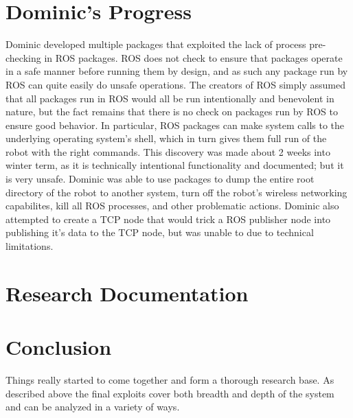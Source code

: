 \documentclass[IEEEtran,letterpaper,10pt,notitlepage,draftclsnofoot,onecolumn]{article}
\begin{document}
\section{Dominic's Progress}
Dominic developed multiple packages that exploited the lack of process pre-checking
in ROS packages. ROS does not check to ensure that packages operate in a safe manner before running
them by design, and as such any package run by ROS can quite easily do unsafe operations. The creators of 
ROS simply assumed that all packages run in ROS would all be run intentionally and benevolent in nature,
but the fact remains that there is no check on packages run by ROS to ensure good behavior. In particular,
ROS packages can make system calls to the underlying operating system's shell, which in turn gives them full 
run of the robot with the right commands. This discovery was made about 2 weeks into winter term, as it is
technically intentional functionality and documented; but it is very unsafe. Dominic was able to use packages
to dump the entire root directory of the robot to another system, turn off the robot's wireless networking 
capabilites, kill all ROS processes, and other problematic actions. Dominic also attempted to create a TCP node
that would trick a ROS publisher node into publishing it's data to the TCP node, but was unable to due to 
technical limitations.

\section{Research Documentation}

\section{Conclusion}
Things really started to come together and form a thorough research base.
As described above the final exploits cover both breadth and depth of the system and can be analyzed in a variety of ways.




\end{document}
